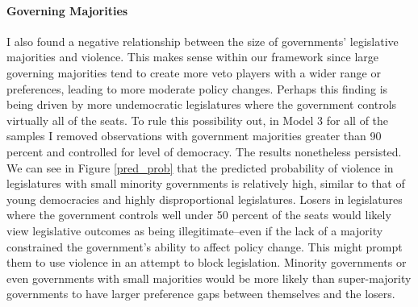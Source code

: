 \documentclass[a4paper]{article}\usepackage{graphicx, color}
\begin{document}
{{\paragraph{Governing Majorities}
I also found a negative relationship between the size of governments' legislative majorities and violence. This makes sense within our framework since large governing majorities tend to create more veto players with a wider range or preferences, leading to more moderate policy changes. Perhaps this finding is being driven by more undemocratic legislatures where the government controls virtually all of the seats. To rule this possibility out, in Model 3 for all of the samples I removed observations with government majorities greater than 90 percent and controlled for level of democracy. The results nonetheless persisted. We can see in Figure \ref{pred_prob} that the predicted probability of violence in legislatures with small minority governments is relatively high, similar to that of young democracies and highly disproportional legislatures. Losers in legislatures where the government controls well under 50 percent of the seats would likely view legislative outcomes as being illegitimate--even if the lack of a majority constrained the government's ability to affect policy change. This might prompt them to use violence in an attempt to block legislation. Minority governments or even governments with small majorities would be more likely than super-majority governments to have larger preference gaps between themselves and the losers. 

}}
\end{document}
